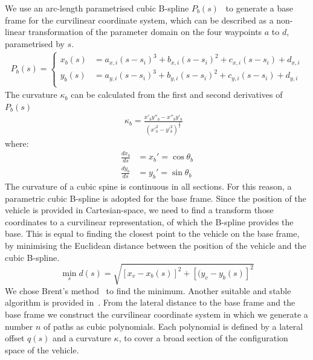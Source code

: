 We use an arc-length parametrised cubic B-spline $P_b(s)$~\cite{wang_arc-length_2002} to generate a base frame for the curvilinear coordinate system, which can be described as a non-linear transformation of the parameter domain on the four waypoints $a$ to $d$, parametrised by $s$.
\begin{align}
	P_b(s) = \begin{cases}
	x_b(s) & = a_{x,i}(s - s_i)^3 + b_{x,i}(s - s_i)^2   + c_{x,i}(s - s_i) + d_{x,i} \\
	y_b(s) & = a_{y,i}(s - s_i)^3 + b_{y,i}(s - s_i)^2   + c_{y,i}(s - s_i) + d_{y,i} \\
	\end{cases}
\end{align}
The curvature $\kappa_b$ can be calculated from the first and second derivatives of $P_b(s)$
\begin{align}
\kappa_b = \frac{x'_by''_b - x''_by'_b}{(x'^2_b - y'^2_b)^\frac{3}{2}} &
\end{align}
where:
\begin{subequations}
	\begin{align}
	\frac{dx_b}{ds} &= x_b' = \cos\theta_b \\
	\frac{dy_b}{ds} &= y_b' = \sin\theta_b
	\end{align}
\end{subequations}
The curvature of a cubic spine is continuous in all sections.
For this reason, a parametric cubic B-spline is adopted for the base frame.
Since the position of the vehicle is provided in Cartesian-space, we need to find a transform those coordinates to a curvilinear representation, of which the B-spline provides the base.
This is equal to finding the closest point to the vehicle on the base frame, by minimising the Euclidean distance between the position of the vehicle and the cubic B-spline.
\begin{equation}
\min_s d(s) = \sqrt{[x_v - x_b(s)]^2+[(y_v - y_b(s)]^2}
\end{equation}
We chose Brent's method~\cite{brent_algorithms_1973} to find the minimum. Another suitable and stable algorithm is provided in~\cite{xu_accurate_2008}.
From the lateral distance to the base frame and the base frame we construct the curvilinear coordinate system in which we generate a number $n$ of paths as cubic polynomials.
Each polynomial is defined by a lateral offset $q(s)$ and a curvature $\kappa$, to cover a broad section of the configuration space of the vehicle.
